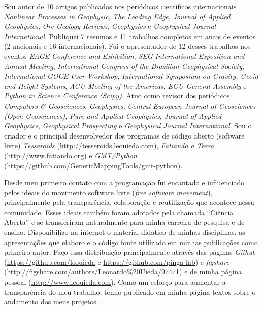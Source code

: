 \documentclass[12pt,a4paper,oneside,titlepage,onecolumn]{article}
\begin{document}
Sou autor de 10 artigos publicados nos periódicos científicos internacionais
{\em Nonlinear Processes in Geophysic},
{\em The Leading Edge},
{\em Journal of Applied Geophysics},
{\em Ore Geology Reviews},
{\em Geophysics} e
{\em Geophysical Journal International}.
Publiquei 7 resumos e 11 trabalhos completos em anais de eventos (2 nacionais e
16 internacionais).
Fui o apresentador de 12 desses trabalhos nos eventos
{\em EAGE Conference and Exhibition},
{\em SEG International Exposition and Annual Meeting},
{\em International Congress of the Brazilian Geophysical Society},
{\em International GOCE User Workshop},
{\em International Symposium on Gravity, Geoid and Height Systems},
{\em AGU Meeting of the Americas},
{\em EGU General Assembly} e
{\em Python in Science Conference (Scipy)}.
Atuo como revisor dos periódicos
{\em Computers \& Geosciences},
{\em Geophysics},
{\em Central European Journal of Geosciences (Open Geosciences)},
{\em Pure and Applied Geophysics},
{\em Journal of Applied Geophysics},
{\em Geophysical Prospecting}
e {\em Geophysical Journal International}.
Sou o criador e o principal desenvolvedor dos programas de código aberto
(software livre)
{\em Tesseroids} (\url{http://tesseroids.leouieda.com}),
{\em Fatiando a Terra} (\url{http://www.fatiando.org}) e
{\em GMT/Python} (\url{https://github.com/GenericMappingTools/gmt-python}).

Desde meu primeiro contato com a programação fui encantado e influenciado pelos
ideais do movimento software livre ({\em free software movement}),
principalmente pela transparência, colaboração e reutilização que acontece
nessa comunidade.
Esses ideais também foram adotados pela chamada ``Ciência Aberta'' e se
transferiram naturalmente para minha carreira de pesquisa e de ensino.
Disponibilizo na internet o material didático de minhas disciplinas, as
apresentações que elaboro e o código fonte utilizado em minhas publicações como
primeiro autor.
Faço essa distribuição principalmente através das páginas
{\em Github} (\url{https://github.com/leouieda} e
\url{https://github.com/pinga-lab}) e
{\em figshare} (\url{http://figshare.com/authors/Leonardo%20Uieda/97471})
e de minha página pessoal (\url{http://www.leouieda.com}).
Como um esforço para aumentar a transparência do meu trabalho, tenho publicado
em minha página textos sobre o andamento dos meus projetos.
\end{document}
